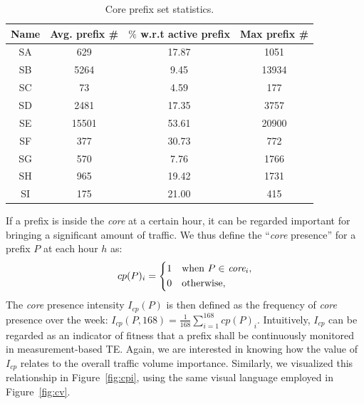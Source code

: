 \begin{table}[!htb]
\centering
\footnotesize
\begin{tabular}{cccc}\toprule
\textbf{Name} & \textbf{Avg. prefix \#} & \textbf{$\%$ w.r.t active prefix} & \textbf{Max prefix \#}\\
\midrule
SA & 629  & 17.87  & 1051\\
SB & 5264 & 9.45  & 13934\\
SC & 73  & 4.59    & 177\\
SD & 2481  & 17.35 & 3757\\
SE & 15501  & 53.61 & 20900\\
SF & 377  & 30.73    & 772\\
SG & 570 & 7.76    & 1766\\
SH & 965  & 19.42   & 1731\\
SI & 175  & 21.00    & 415\\
\bottomrule
\end{tabular}
\caption{Core prefix set statistics.}
\label{tab:core_size}
\end{table}

If a prefix is inside the \textit{core} at a certain hour, it can be regarded important for bringing a significant amount of traffic.
We thus define the ``\textit{core} presence'' for a prefix $P$ at each hour $h$ as:
\begin{equation*}
cp(P)_i = \begin{dcases*}
        1  & when $P \in$ $\textit{core}_i$,\\
        0 & otherwise,
        \end{dcases*}
\label{eq:cp}
\end{equation*}
The \textit{core} presence intensity $I_{cp}(P)$ is then defined as the frequency of \textit{core} presence over the week:
$I_{cp}(P, 168) = \frac{1}{168} \sum_{i=1}^{168} cp(P)_i$.
Intuitively, $I_{cp}$ can be regarded as an indicator of fitness that a prefix shall be continuously monitored in measurement-based TE.
Again, we are interested in knowing how the value of $I_{cp}$ relates to the overall traffic volume importance.
Similarly, we visualized this relationship in Figure~\ref{fig:cpi}, using the same visual language employed in Figure~\ref{fig:cv}.

